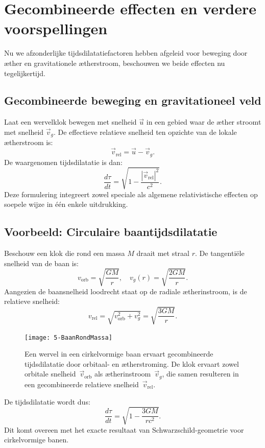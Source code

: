 \section{Gecombineerde effecten en verdere voorspellingen}

Nu we afzonderlijke tijdsdilatatiefactoren hebben afgeleid voor beweging door æther en gravitationele ætherstroom, beschouwen we beide effecten nu tegelijkertijd.

\subsection*{Gecombineerde beweging en gravitationeel veld}

Laat een wervelklok bewegen met snelheid $\vec{u}$ in een gebied waar de æther stroomt met snelheid $\vec{v}_g$. De effectieve relatieve snelheid ten opzichte van de lokale ætherstroom is:
\[
    \vec{v}_{\text{rel}} = \vec{u} - \vec{v}_g.
\]
De waargenomen tijdsdilatatie is dan:
\[
    \frac{d\tau}{dt} = \sqrt{1 - \frac{|\vec{v}_{\text{rel}}|^2}{c^2}}. \tag{5}
\]
Deze formulering integreert zowel speciale als algemene relativistische effecten op soepele wijze in één enkele uitdrukking.

\subsection*{Voorbeeld: Circulaire baantijdsdilatatie}

Beschouw een klok die rond een massa $M$ draait met straal $r$. De tangentiële snelheid van de baan is:
\[
    v_{\text{orb}} = \sqrt{\frac{GM}{r}}, \quad v_g(r) = \sqrt{\frac{2GM}{r}}.
\]
Aangezien de baansnelheid loodrecht staat op de radiale ætherinstroom, is de relatieve snelheid:
\[
    v_{\text{rel}} = \sqrt{v_{\text{orb}}^2 + v_g^2} = \sqrt{\frac{3GM}{r}}.
\]

\begin{figure}[htbp]
    \centering
    \texttt{[image: 5-BaanRondMassa]}
    \caption{Een wervel in een cirkelvormige baan ervaart gecombineerde tijdsdilatatie door orbitaal- en ætherstroming. De klok ervaart zowel orbitale snelheid~$\vec{v}_{\mathrm{orb}}$ als ætherinstroom~$\vec{v}_g$, die samen resulteren in een gecombineerde relatieve snelheid~$\vec{v}_{\mathrm{rel}}$.}
    \label{fig:BaanRondMassa}
\end{figure}


De tijdsdilatatie wordt dus:
\[
    \frac{d\tau}{dt} = \sqrt{1 - \frac{3GM}{rc^2}}. \tag{6}
\]
Dit komt overeen met het exacte resultaat van Schwarzschild-geometrie voor cirkelvormige banen.

